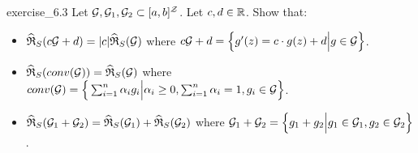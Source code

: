 \begin{exercise}{}{exercise_6.3}
    Let $\G, \G_1, \G_2 \subset [a,b]^{\mathcal{Z}}$. Let $c, d \in \R$. Show that:
    \begin{itemize}
        \item $\ERC_S(c\G + d) = |c|\ERC_S(\G)$ where $c\G+d=\bigCurl{g'(z) = c\cdot g(z) + d \Big| g\in\G}$.
        \item $\ERC_S(conv(\G))=\ERC_S(\G)$ where $conv(\G)=\bigCurl{\sum_{i=1}^n \alpha_ig_i\Big|\alpha_i\ge0, \sum_{i=1}^n\alpha_i=1, g_i\in\G}$.
        \item $\ERC_S(\G_1 + \G_2)=\ERC_S(\G_1) + \ERC_S(\G_2)$ where $\G_1 + \G_2 = \bigCurl{g_1 + g_2 \Big| g_1\in\G_1, g_2\in\G_2}$.
    \end{itemize}
\end{exercise}

